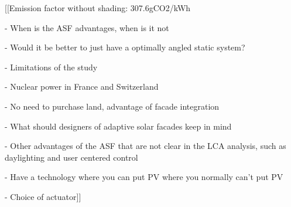 [[Emission factor without shading: 307.6gCO2/kWh

- When is the ASF advantages, when is it not

- Would it be better to just have a optimally angled static system?

- Limitations of the study

- Nuclear power in France and Switzerland

- No need to purchase land, advantage of facade integration

- What should designers of adaptive solar facades keep in mind 

- Other advantages of the ASF that are not clear in the LCA analysis, such as daylighting and user centered control 

- Have a technology where you can put PV where you normally can't put PV

- Choice of actuator]]